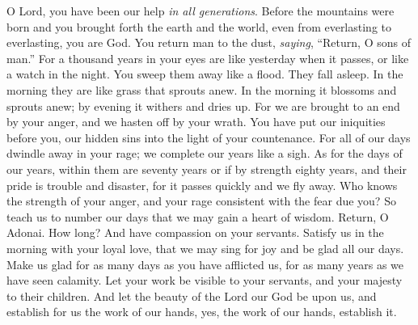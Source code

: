 \begin{biblechapter} %
 O Lord, you have been our help \textit{in all generations}.
\verse Before the mountains were born 
and you brought forth the earth and the world, 
even from everlasting to everlasting, you are God.
\verse You return man to the dust, 
\textit{saying}, “Return, O sons of man.”
\verse For a thousand years in your eyes 
are like yesterday when it passes, 
or like a watch in the night.
\verse You sweep them away like a flood. 
They fall asleep. 
In the morning they are like grass that sprouts anew.
\verse In the morning it blossoms and sprouts anew; 
by evening it withers and dries up.
\verse For we are brought to an end by your anger, 
and we hasten off by your wrath.
\verse You have put our iniquities before you, 
our hidden sins into the light of your countenance.
\verse For all of our days dwindle away in your rage; 
we complete our years like a sigh.
\verse As for the days of our years, within them are seventy years 
or if by strength eighty years, and their pride is trouble and disaster, 
for it passes quickly and we fly away.
\verse Who knows the strength of your anger, 
and your rage consistent with the fear due you?
\verse So teach us to number our days 
that we may gain a heart of wisdom.
\verse Return, O Adonai. How long? 
And have compassion on your servants.
\verse Satisfy us in the morning with your loyal love, 
that we may sing for joy and be glad all our days.
\verse Make us glad for as many days as you have afflicted us, 
for as many years as we have seen calamity.
\verse Let your work be visible to your servants, 
and your majesty to their children.
\verse And let the beauty of the Lord our God be upon us, 
and establish for us the work of our hands, 
yes, the work of our hands, establish it.
\end{biblechapter}

